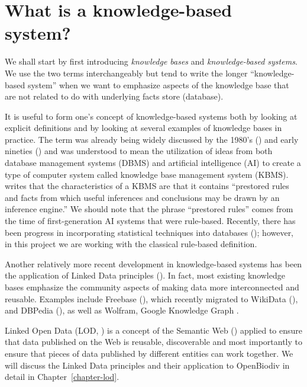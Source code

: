 \section{What is a knowledge-based system?}

We shall start by first introducing \emph{knowledge bases} and \emph{knowledge-based systems}.  We use the two terms interchangeably but tend to write the longer  ``knowledge-based system'' when we want to emphasize aspects of the knowledge base that are not related to do with underlying facts store (database).

It is useful to form one's concept of knowledge-based systems both by looking at explicit definitions and by looking at several examples of knowledge bases in practice. The term was already being widely discussed by the 1980's (\cite{brodie_kbms_1989}) and early nineties (\cite{harris_knowledge_1993}) and was understood to mean the utilization of ideas from both database management systems (DBMS) and artificial intelligence (AI) to create a type of computer system called knowledge base management system (KBMS). \cite{harris_knowledge_1993} writes that the characteristics of a KBMS are that it contains ``prestored rules and facts from which useful inferences and conclusions may be drawn by an inference engine.''  We should note that the phrase ``prestored rules'' comes from the time of first-generation AI systems that were rule-based. Recently, there has been progress in incorporating statistical techniques into databases (\cite{mansinghka_bayesdb:_2015}); however, in this project we are working with the classical rule-based definition.

Another relatively more recent development in knowledge-based systems has been the application of Linked Data principles (\cite{heath_linked_2011}). In fact, most existing knowledge bases emphasize the community aspects of making data more interconnected and reusable. Examples include Freebase (\cite{bollacker_freebase:_2008}), which recently migrated to WikiData (\cite{vrandecic_wikidata:_2014, pellissier_tanon_freebase_2016}), and DBPedia (\cite{hutchison_dbpedia:_2007}), as well as Wolfram, Google Knowledge Graph .

Linked Open Data (LOD, \cite{heath_linked_2011}) is a concept of the Semantic Web (\cite{berners-lee_semantic_2001}) applied to ensure that data published on the Web is reusable, discoverable and most importantly to ensure that pieces of data published by different entities can work together.  We will discuss the Linked Data principles and their application to OpenBiodiv in detail in Chapter~\ref{chapter-lod}.

